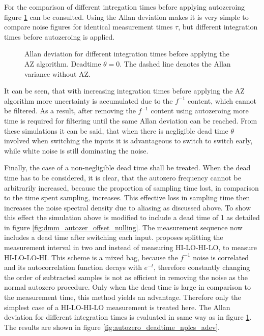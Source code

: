 For the comparison of different intregation times before applying autozeroing figure \ref{fig:autozero_nplcs_adev} can be consulted. Using the Allan deviation makes it is very simple to compare noise figures for identical measurement times $\tau$, but different integration times before autozeroing is applied.

\begin{figure}[ht]
    \centering
    
    \caption{Allan deviation for different integration times before applying the AZ algorithm. Deadtime $\theta = 0$. The dashed line denotes the Allan variance without AZ.}
    \label{fig:autozero_nplcs_adev}
\end{figure}

It can be seen, that with increasing integration times before applying the AZ algorithm more uncertainty is accumulated due to the $f^{-1}$ content, which cannot be filtered. As a result, after removing the $f^{-1}$ content using autozeroing more time is required for filtering until the same Allan deviation can be reached. From these simulations it can be said, that when there is negligible dead time $\theta$ involved when switching the inputs it is advantageous to switch to switch early, while white noise is still dominating the noise.

Finally, the case of a non-negligible dead time shall be treated. When the dead time has to be considered, it is clear, that the autozero frequency cannot be arbitrarily increased, because the proportion of sampling time lost, in comparison to the time spent sampling, increases. This effective loss in sampling time then increases the noise spectral density due to aliasing as discussed above. To show this effect the simulation above is modified to include a dead time of \qty{1}{\plc} as detailed in figure \ref{fig:dmm_autozer_offset_nulling}. The measurement sequence now includes a dead time after switching each input. \citeauthor{autozero_with_dead_time} proposes \cite{autozero_with_dead_time} splitting the measurement interval in two and instead of measuring HI-LO-HI-LO, to measure HI-LO-LO-HI. This scheme is a mixed bag, because the $f^{-1}$ noise is correlated and its autocorrelation function decays with $e^{-t}$, therefore constantly changing the order of subtracted samples is not as efficient in removing the noise as the normal autozero procedure. Only when the dead time is large in comparison to the measurement time, this method yields an advantage. Therefore only the simplest case of a HI-LO-HI-LO measurement is treated here. The Allan deviation for different integration times is evaluated in same way as in figure \ref{fig:autozero_nplcs_adev}. The results are shown in figure \ref{fig:autozero_deadtime_nplcs_adev}.


